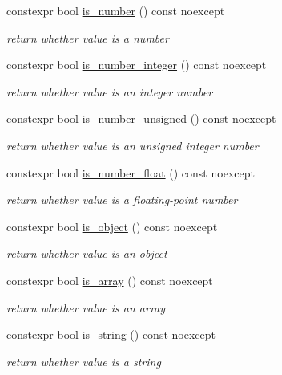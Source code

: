 \begin{DoxyCompactItemize}
constexpr bool \hyperlink{classnlohmann_1_1basic__json_a957eb9594c7f0ca93212c30f3a400873}{is\-\_\-number} () const noexcept
\begin{DoxyCompactList}\small\item\em return whether value is a number \end{DoxyCompactList}\item 
constexpr bool \hyperlink{classnlohmann_1_1basic__json_a435c93d06ef28f8003c31f62ffe4aed1}{is\-\_\-number\-\_\-integer} () const noexcept
\begin{DoxyCompactList}\small\item\em return whether value is an integer number \end{DoxyCompactList}\item 
constexpr bool \hyperlink{classnlohmann_1_1basic__json_aa388dc101bc285a98122a38fd2e3a9db}{is\-\_\-number\-\_\-unsigned} () const noexcept
\begin{DoxyCompactList}\small\item\em return whether value is an unsigned integer number \end{DoxyCompactList}\item 
constexpr bool \hyperlink{classnlohmann_1_1basic__json_a7641371be8a347f3c1e05ac089a74c36}{is\-\_\-number\-\_\-float} () const noexcept
\begin{DoxyCompactList}\small\item\em return whether value is a floating-\/point number \end{DoxyCompactList}\item 
constexpr bool \hyperlink{classnlohmann_1_1basic__json_a94ba313c00f1713fa4be85de64083754}{is\-\_\-object} () const noexcept
\begin{DoxyCompactList}\small\item\em return whether value is an object \end{DoxyCompactList}\item 
constexpr bool \hyperlink{classnlohmann_1_1basic__json_a256a4cef002023acab3c9d75b569f54a}{is\-\_\-array} () const noexcept
\begin{DoxyCompactList}\small\item\em return whether value is an array \end{DoxyCompactList}\item 
constexpr bool \hyperlink{classnlohmann_1_1basic__json_a409e854d754f5684b2cce74ee20dbc3b}{is\-\_\-string} () const noexcept
\begin{DoxyCompactList}\small\item\em return whether value is a string \end{DoxyCompactList}\item 

\end{DoxyCompactItemize}
